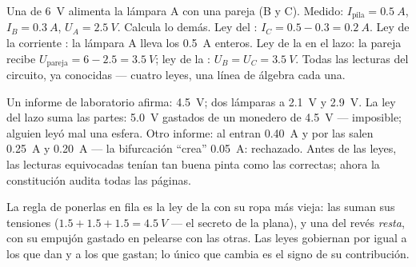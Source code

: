 \begin{example}\label{ex:g8:circuit-laws:worked}
Una  de \qty{6}{V} alimenta la lámpara A 
con una pareja  (B y C). Medido: $I_{\text{pila}} =
\qty{0.5}{A}$, $I_B = \qty{0.3}{A}$, $U_A = \qty{2.5}{V}$. Calcula lo
demás. Ley del : $I_C = 0.5 - 0.3 = \qty{0.2}{A}$. Ley de la
corriente : la lámpara A lleva los \qty{0.5}{A} enteros. Ley de
la  en el lazo: la pareja recibe $U_{\text{pareja}} = 6 -
2.5 = \qty{3.5}{V}$; ley de la  : $U_B = U_C =
\qty{3.5}{V}$. Todas las lecturas del circuito, ya conocidas --- cuatro
leyes, una línea de álgebra cada una.
\end{example}

\begin{example}\label{ex:g8:circuit-laws:liedetector}
Un informe de laboratorio afirma:  \qty{4.5}{V}; dos
lámparas  a \qty{2.1}{V} y \qty{2.9}{V}. La ley del lazo suma
las partes: \qty{5.0}{V} gastados de un monedero de \qty{4.5}{V} ---
imposible; alguien leyó mal una esfera. Otro informe: al 
entran \qty{0.40}{A} y por las  salen \qty{0.25}{A} y
\qty{0.20}{A} --- la bifurcación ``crea'' \qty{0.05}{A}: rechazado.
Antes de las leyes, las lecturas equivocadas tenían tan buena pinta
como las correctas; ahora la constitución audita todas las páginas.
\end{example}

\begin{remark}\label{rem:g8:circuit-laws:batteries}
La regla de ponerlas en fila es la ley de la  
con su ropa más vieja: las   suman sus
tensiones ($1.5 + 1.5 + 1.5 = \qty{4.5}{V}$ --- el secreto de la
 plana), y una  del revés \emph{resta}, con su empujón
gastado en pelearse con las otras. Las leyes gobiernan por igual a los
que dan y a los que gastan; lo único que cambia es el signo de su
contribución.
\end{remark}

